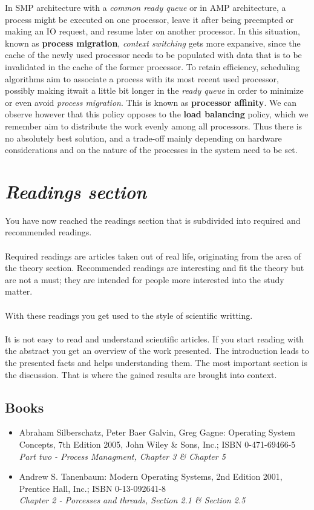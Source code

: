 \documentclass[11pt,a4paper]{scrreprt}
\begin{document}
In SMP architecture with a \textit{common ready queue} or in AMP architecture, a process might be executed on one processor, leave it after being preempted or making an IO request, and resume later on another processor. In this situation, known as \textbf{process migration}, \textit{context switching} gets more expansive, since the cache of the newly used processor needs to be populated with data that is to be invalidated in the cache of the former processor. To retain efficiency, scheduling algorithms aim to associate a process with its most recent used processor, possibly making itwait a little bit longer in the \textit{ready queue} in order to minimize or even avoid \textit{process migration}. This is known as \textbf{processor affinity}. We can observe however that this policy opposes to the \textbf{load balancing} policy, which we remember aim to distribute the work evenly among all processors. Thus there is no absolutely best solution, and a trade-off mainly depending on hardware considerations and on the nature of the processes in the system need to be set.

\section{\textit{Readings section}}
You have now reached the readings section that is subdivided into required and recommended readings. \\\\
Required readings are articles taken out of real life, originating from the area of the theory section. 
Recommended readings are interesting and fit the theory but are not a must; they are intended for people more interested into the study matter. \\\\
With these readings you get used to the style of scientific writting. \\\\
It is not easy to read and understand scientific articles. If you start reading with the abstract you get an overview of the work presented. The introduction leads to the presented facts and helps understanding them. The most important section is the discussion. That is where the gained results are brought into context.

\subsection{Books}
\begin{itemize}
\item Abraham Silberschatz, Peter Baer Galvin, Greg Gagne: Operating System Concepts, 7th Edition 2005,
John Wiley \& Sons, Inc.; ISBN 0-471-69466-5 \\
\textit{Part two - Process Managment, Chapter 3 \& Chapter 5} 
\item Andrew S. Tanenbaum: Modern Operating Systems, 2nd Edition 2001, Prentice Hall, Inc.; ISBN 0-13-092641-8 \\
\textit{Chapter 2 - Porcesses and threads, Section 2.1 \& Section 2.5}
\end{itemize}
\end{document}
